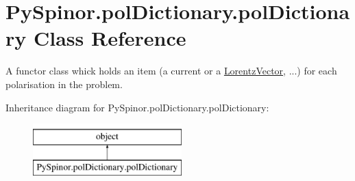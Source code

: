 \hypertarget{class_py_spinor_1_1pol_dictionary_1_1pol_dictionary}{}\section{Py\+Spinor.\+pol\+Dictionary.\+pol\+Dictionary Class Reference}
\label{class_py_spinor_1_1pol_dictionary_1_1pol_dictionary}


A functor class whick holds an item (a current or a \hyperlink{namespace_py_spinor_1_1_lorentz_vector}{Lorentz\+Vector}, ...) for each polarisation in the problem.  


Inheritance diagram for Py\+Spinor.\+pol\+Dictionary.\+pol\+Dictionary\+:\begin{figure}[H]
\begin{center}
\leavevmode
\includegraphics[height=2.000000cm]{class_py_spinor_1_1pol_dictionary_1_1pol_dictionary}
\end{center}
\end{figure}
